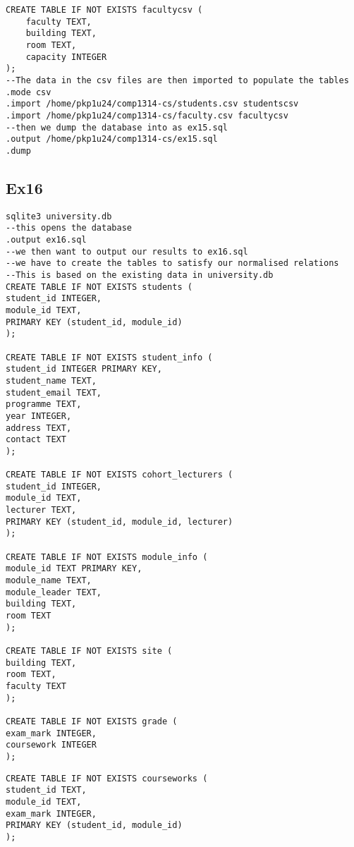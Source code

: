 \documentclass[12pt]{article}
\begin{document}
{{\begin{tcolorbox}
\begin{verbatim}
CREATE TABLE IF NOT EXISTS facultycsv (
    faculty TEXT,
    building TEXT,
    room TEXT,
    capacity INTEGER
);
--The data in the csv files are then imported to populate the tables
.mode csv
.import /home/pkp1u24/comp1314-cs/students.csv studentscsv
.import /home/pkp1u24/comp1314-cs/faculty.csv facultycsv
--then we dump the database into as ex15.sql
.output /home/pkp1u24/comp1314-cs/ex15.sql
.dump
\end{verbatim}
\end{tcolorbox}
\subsection{Ex16}
\begin{tcolorbox}[
    enhanced,
    attach boxed title to top left={xshift=6mm,yshift=-3mm},
    colback=lightgreen!20,
    colframe=lightgreen,
    colbacktitle=lightgreen,
    title=Linux shell,
    fonttitle=\bfseries\color{black},
    boxed title style={size=small,colframe=lightgreen,sharp corners},
    sharp corners,
]
\begin{verbatim}
sqlite3 university.db 
--this opens the database
.output ex16.sql
--we then want to output our results to ex16.sql
--we have to create the tables to satisfy our normalised relations  
--This is based on the existing data in university.db
CREATE TABLE IF NOT EXISTS students (
student_id INTEGER,
module_id TEXT,
PRIMARY KEY (student_id, module_id)
);

CREATE TABLE IF NOT EXISTS student_info (
student_id INTEGER PRIMARY KEY,
student_name TEXT,
student_email TEXT,
programme TEXT,
year INTEGER,
address TEXT,
contact TEXT
);

CREATE TABLE IF NOT EXISTS cohort_lecturers (
student_id INTEGER,
module_id TEXT,
lecturer TEXT,
PRIMARY KEY (student_id, module_id, lecturer)
);

CREATE TABLE IF NOT EXISTS module_info (
module_id TEXT PRIMARY KEY,
module_name TEXT,
module_leader TEXT,
building TEXT,
room TEXT
);

CREATE TABLE IF NOT EXISTS site (
building TEXT,
room TEXT,
faculty TEXT
);

CREATE TABLE IF NOT EXISTS grade (
exam_mark INTEGER,
coursework INTEGER
);
\end{verbatim}
\end{tcolorbox}
\begin{tcolorbox}[
    enhanced,
    attach boxed title to top left={xshift=6mm,yshift=-3mm},
    colback=lightgreen!20,
    colframe=lightgreen,
    colbacktitle=lightgreen,
    title=Linux shell,
    fonttitle=\bfseries\color{black},
    boxed title style={size=small,colframe=lightgreen,sharp corners},
    sharp corners,
]
\begin{verbatim}
CREATE TABLE IF NOT EXISTS courseworks (
student_id TEXT,
module_id TEXT,
exam_mark INTEGER,
PRIMARY KEY (student_id, module_id)
);


\end{verbatim}
\end{tcolorbox}}}
\end{document}
